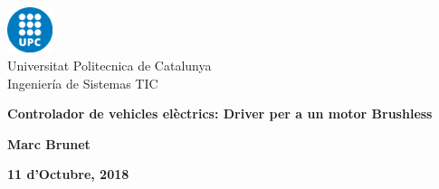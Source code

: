 \begin{titlepage}
    \begin{center}
        \vspace*{1cm}
        
        \includegraphics[width=0.1\textwidth]{upc}\\
        Universitat Politecnica de Catalunya\\
        Ingeniería de Sistemas TIC\\
        
        \vspace{2cm}
        
        {\Large \textbf{Controlador de vehicles elèctrics: Driver per a un motor Brushless}}
        
        \vspace{1.5cm}
        
        \textbf{Marc Brunet}
        
        \vfill
        
        \textbf{11 d'Octubre, 2018}
    \end{center}
\end{titlepage}